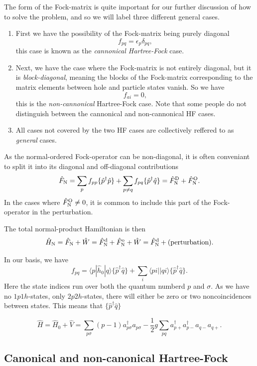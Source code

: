 \documentclass[a4paper, 11pt, notitlepage, english]{article}
\newcommand{\brakket}[2]{\langle #1 || #2 \rangle}
\newcommand{\op}[1]{\hat{#1}}
\newcommand{\braopket}[3]{\langle #1 | {#2} | #3 \rangle}
\newcommand{\eps}{\epsilon}
\begin{document}
The form of the Fock-matrix is quite important for our further discussion of how to solve the problem, and so we will label three different general cases.
\begin{enumerate}
	\item First we have the possibility of the Fock-matrix being purely diagonal
	$$f_{pq} = \eps_p \delta_{pq},$$
	this case is known as the \emph{cannonical Hartree-Fock} case.
	\item Next, we have the case where the Fock-matrix is not entirely diagonal, but it is \emph{block-diagonal}, meaning the blocks of the Fock-matrix corresponding to the matrix elements between hole and particle states vanish. So we have
	$$f_{ai} = 0,$$
	this is the \emph{non-cannonical} Hartree-Fock case. Note that some people do not distinguish between the cannonical and non-cannonical HF cases.
	\item All cases not covered by the two HF cases are collectively reffered to as \emph{general} cases.
\end{enumerate}
As the normal-ordered Fock-operator can be non-diagonal, it is often conveniant to split it into its diagonal and off-diagonal contributions
$$\op{F}_{\rm N} = \sum_p f_{pp}\{\op{p}^\dagger \op{p}\} + \sum_{p\neq q} f_{pq}\{\op{p}^\dagger \op{q}\} = \op{F}_{\rm N}^{\rm D} + \op{F}_{\rm N}^{\rm O}.$$
In the cases where $\op{F}_{\rm N}^{\rm O} \neq 0$, it is common to include this part of the Fock-operator in the perturbation.

The total normal-product Hamiltonian is then
$$\op{H}_{\rm N} = \op{F}_{\rm N} + \op{W} = \op{F}^{\rm d}_{\rm N} + \op{F}^{\rm o}_{\rm N} + \op{W} = \op{F}^{\rm d}_{\rm N} + \mbox{(perturbation)}.$$

In our basis, we have
$$f_{pq} = \braopket{p}{\op{h}_0}{q}\{\op{p}^\dag \op{q}\}  + \sum_{i} \brakket{pi}{qi}\{\op{p}^\dag \op{q}\}.$$
Here the state indices run over both the quantum numberd $p$ and $\sigma$. As we have no $1p1h$-states, only $2p2h$-states, there will either be zero or two noncoincidences between states. This means that $\{\op{p}^\dag \op{q}\}$

\clearpage







$$\op{H} = \op{H}_0 + \op{V} = \sum_{p \sigma} (p-1)a_{p\sigma}^\dagger a_{p\sigma} 
 -\frac{1}{2}g \sum_{p q} a_{p+}^\dagger a_{p-}^\dagger a_{q-} a_{q+}.$$


\subsection*{Canonical and non-canonical Hartree-Fock}
\end{document}
